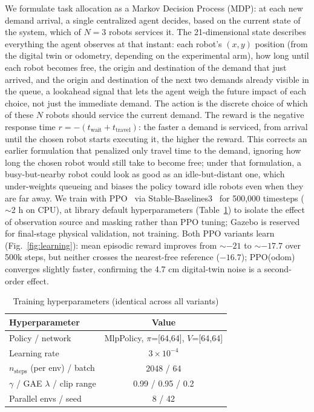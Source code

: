 \documentclass[conference]{IEEEtran}
\begin{document}
We formulate task allocation as a Markov Decision Process (MDP): at each new demand arrival, a single centralized agent decides, based on the current state of the system, which of $N=3$ robots services it. The 21-dimensional state describes everything the agent observes at that instant: each robot's $(x,y)$ position (from the digital twin or odometry, depending on the experimental arm), how long until each robot becomes free, the origin and destination of the demand that just arrived, and the origin and destination of the next two demands already visible in the queue, a lookahead signal that lets the agent weigh the future impact of each choice, not just the immediate demand. The action is the discrete choice of which of these $N$ robots should service the current demand. The reward is the negative response time $r = -(t_{\text{wait}} + t_{\text{travel}})$: the faster a demand is serviced, from arrival until the chosen robot starts executing it, the higher the reward. This corrects an earlier formulation that penalized only travel time to the demand, ignoring how long the chosen robot would still take to become free; under that formulation, a busy-but-nearby robot could look as good as an idle-but-distant one, which under-weights queueing and biases the policy toward idle robots even when they are far away. We train with PPO~\cite{schulman2017proximal} via Stable-Baselines3~\cite{stable-baselines3} for 500{,}000 timesteps ($\sim$2 h on CPU), at library default hyperparameters (Table~\ref{tab:hparams}) to isolate the effect of observation source and masking rather than PPO tuning; Gazebo is reserved for final-stage physical validation, not training. Both PPO variants learn (Fig.~\ref{fig:learning}): mean episodic reward improves from $\sim{-21}$ to $\sim{-17.7}$ over 500k steps, but neither crosses the nearest-free reference ($-16.7$); PPO(odom) converges slightly faster, confirming the 4.7 cm digital-twin noise is a second-order effect.

\begin{table}[htbp]
\caption{Training hyperparameters (identical across all variants)}
\begin{center}
\begin{tabular}{|l|c|}
\hline
\textbf{Hyperparameter} & \textbf{Value} \\
\hline
Policy / network & MlpPolicy, $\pi$=[64,64], $V$=[64,64] \\
\hline
Learning rate & $3\times10^{-4}$ \\
\hline
$n_{\text{steps}}$ (per env) / batch & 2048 / 64 \\
\hline
$\gamma$ / GAE $\lambda$ / clip range & 0.99 / 0.95 / 0.2 \\
\hline
Parallel envs / seed & 8 / 42 \\
\hline
\end{tabular}
\label{tab:hparams}
\end{center}
\end{table}
\end{document}

